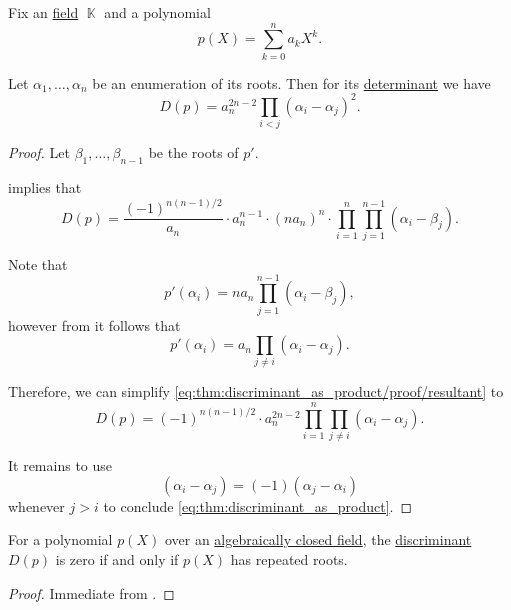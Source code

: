 \begin{proposition}\label{thm:discriminant_as_product}
  Fix an \hyperref[def:algebraically_closed_field]{} \hyperref[def:field]{field} \( \BbbK \) and a polynomial
  \begin{equation*}
    p(X) = \sum_{k=0}^n a_k X^k.
  \end{equation*}

  Let \( \alpha_1, \ldots, \alpha_n \) be an enumeration of its roots. Then for its \hyperref[def:matrix_determinant]{determinant} we have
  \begin{equation}\label{eq:thm:discriminant_as_product}
    D(p) = a_n^{2n - 2} \prod_{i < j} (\alpha_i - \alpha_j)^2.
  \end{equation}
\end{proposition}
\begin{proof}
  Let \( \beta_1, \ldots, \beta_{n-1} \) be the roots of \( p' \).

   implies that
  \begin{equation}\label{eq:thm:discriminant_as_product/proof/resultant}
    D(p) = \frac {(-1)^{n(n-1)/2}} {a_n} \cdot a_n^{n-1} \cdot (n a_n)^n \cdot \prod_{i=1}^n \prod_{j=1}^{n-1} (\alpha_i - \beta_j).
  \end{equation}

  Note that
  \begin{equation*}
    p'(\alpha_i) = n a_n \prod_{j=1}^{n-1} (\alpha_i - \beta_j),
  \end{equation*}
  however from  it follows that
  \begin{equation*}
    p'(\alpha_i) = a_n \prod_{j \neq i} (\alpha_i - \alpha_j).
  \end{equation*}

  Therefore, we can simplify \eqref{eq:thm:discriminant_as_product/proof/resultant} to
  \begin{equation*}
    D(p) = (-1)^{n(n-1)/2} \cdot a_n^{2n-2} \prod_{i=1}^n \prod_{j \neq i} (\alpha_i - \alpha_j).
  \end{equation*}

  It remains to use
  \begin{equation*}
    (\alpha_i - \alpha_j) = (-1)(\alpha_j - \alpha_i)
  \end{equation*}
  whenever \( j > i \) to conclude \eqref{eq:thm:discriminant_as_product}.
\end{proof}

\begin{corollary}\label{thm:discriminant_invertibility}
  For a polynomial \( p(X) \) over an \hyperref[def:algebraically_closed_field]{algebraically closed field}, the \hyperref[def:discriminant]{discriminant} \( D(p) \) is zero if and only if \( p(X) \) has repeated roots.
\end{corollary}
\begin{proof}
  Immediate from .
\end{proof}

